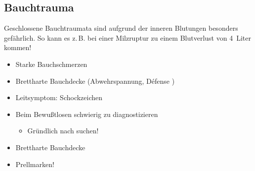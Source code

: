\subsection{ Bauchtrauma}
\label{topic:bauchtrauma-geschlossen}

\Text
{{\TxBeschreibung}}%
{%
Geschlossene Bauchtraumata sind aufgrund der inneren
Blutungen besonders gefährlich. So kann es z.\,B. bei einer
Milzruptur zu einem Blutverlust von 4~Liter kommen!
\cite{Gorgass7}
}%


\begin{Synopsis}
\end{Synopsis}


\TextSlide{\TxSymptome}
{%
\begin{itemize}
  \item Starke  Bauchschmerzen
  \item Brettharte  Bauchdecke  (Abwehrspannung, D\'efense )
  \item Leitsymptom: Schockzeichen
  \item Beim Bewußtlosen schwierig zu  diagnostizieren
  \begin{itemize}
    \item Gründlich nach 
    suchen!
  \end{itemize}
\end{itemize}
}{
\begin{itemize}
  \item Brettharte  Bauchdecke
  \item Prellmarken!
\end{itemize}
}{}{}{}


